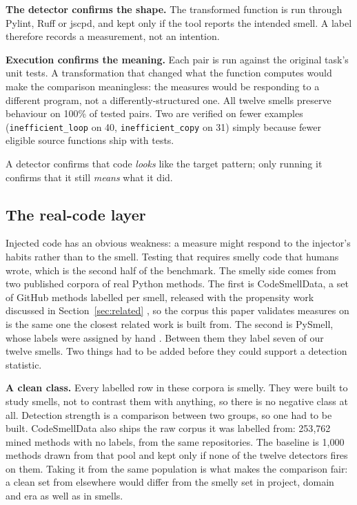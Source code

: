 \documentclass[10pt,a4paper,twocolumn]{article}
\begin{document}
\textbf{The detector confirms the shape.} The transformed function is run through
Pylint, Ruff or jscpd, and kept only if the tool reports the intended smell. A
label therefore records a measurement, not an intention.

\textbf{Execution confirms the meaning.} Each pair is run against the original
task's unit tests. A transformation that changed what the function computes
would make the comparison meaningless: the measures would be responding to a
different program, not a differently-structured one. All twelve smells preserve
behaviour on 100\% of tested pairs. Two are verified on fewer examples
(\texttt{inefficient\_loop} on 40, \texttt{inefficient\_copy} on 31) simply
because fewer eligible source functions ship with tests.

A detector confirms that code \emph{looks} like the target pattern; only running
it confirms that it still \emph{means} what it did.

\subsection{The real-code layer}
\label{sec:realworld}

Injected code has an obvious weakness: a measure might respond to the injector's
habits rather than to the smell. Testing that requires smelly code that humans
wrote, which is the second half of the benchmark. The smelly side comes from two
published corpora of real Python methods. The first is CodeSmellData, a set of
GitHub methods labelled per smell, released with the propensity work discussed
in Section~\ref{sec:related} \cite{velasco2024propense,velasco2025causal}, so
the corpus this paper validates measures on is the same one the closest related
work is built from. The second is PySmell, whose labels were assigned by hand
\cite{chen2016detecting}. Between them they label seven of our twelve smells.
Two things had to be added before they could support a detection statistic.

\textbf{A clean class.} Every labelled row in these corpora is smelly. They were
built to study smells, not to contrast them with anything, so there is no
negative class at all. Detection strength is a comparison between two groups, so
one had to be built. CodeSmellData also ships the raw corpus it was labelled
from: 253{,}762 mined methods with no labels, from the same repositories. The
baseline is 1{,}000 methods drawn from that pool and kept only if none of the
twelve detectors fires on them. Taking it from the same population is what makes
the comparison fair: a clean set from elsewhere would differ from the smelly set
in project, domain and era as well as in smells.
\end{document}
